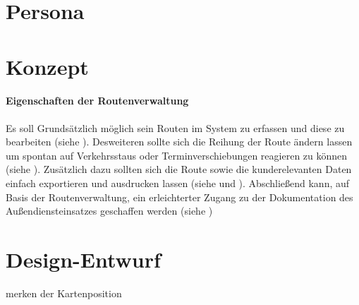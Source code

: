 \documentclass[Bachelorarbeit.tex]{subfiles}
\begin{document}
\section{Persona}
\label{persona}

\section{Konzept}
\label{chap:entwicklung:sec:konzept}


\paragraph{Eigenschaften der Routenverwaltung}

Es soll Grundsätzlich möglich sein Routen im System zu erfassen und diese zu bearbeiten (siehe ).
Desweiteren sollte sich die Reihung der Route ändern lassen um spontan auf Verkehrsstaus oder Terminverschiebungen reagieren zu können (siehe ).
Zusätzlich dazu sollten sich die Route sowie die kunderelevanten Daten einfach exportieren und ausdrucken lassen (siehe  und ). 
Abschließend kann, auf Basis der Routenverwaltung, ein erleichterter Zugang zu der Dokumentation des Außendiensteinsatzes geschaffen werden (siehe )

\section{Design-Entwurf}
\label{chap:entwicklung:sec:design_entwurf}

merken der Kartenposition

\end{document}
